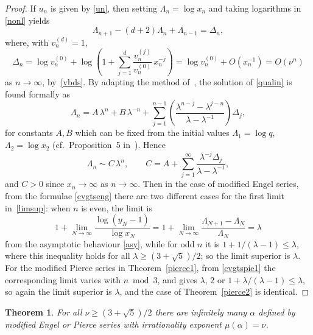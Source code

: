 \documentclass[10pt, a4paper]{amsart}
\numberwithin{equation}{section}
\newcommand\la{\lambda}
\newcommand\La{\Lambda}
\newcommand\De{\Delta}
\newcommand\al{{\alpha}}
\theoremstyle{plain}
\newtheorem{thm}{Theorem}[section]
\theoremstyle{definition}
\begin{document}
\begin{proof}
If $u_n$ is given by \eqref{un}, then setting 
$\La_n=\log x_n$ and taking logarithms in \eqref{nonl} yields
\begin{equation}
\label{qualin}
\La_{n+1}-(d+2)\La_n + \La_{n-1} = \De_n, 
\end{equation} 
where, with 
$v_n^{(d)}=1$, 
\[ 
\De_n  = \log v_n^{(0)} + 
\log \left(1+ \sum_{j=1}^{d} \frac{v_n^{(j)}}{v_n^{(0)}} \, x_n^{-j}\right) 
= \log v_n^{(0)} + O(x_n^{-1})=O(\nu^n)
\]
as $n\to \infty$, by~\eqref{vbds}.
By adapting the method of~\cite{ahosloane}, the solution of \eqref{qualin} 
is found formally as 
\begin{equation} 
\label{form}
\La_n = A\, \la^n + B\, \la^{-n} + \sum_{j=1}^{n-1} 
\left(\frac{\la^{n-j}-\la^{j-n}}{\la-\la^{-1}}\right) \De_j, 
\end{equation} 
for constants $A,B$ which can be fixed from the 
initial values $\La_1=\log q$, $\La_2=\log x_2$ 
(cf.\ Proposition~5 in~\cite{Hone1}).  Hence 
\begin{equation}
\label{asy} 
\La_n\sim C\,\la^n, \qquad C = A + \sum_{j=1}^\infty \frac{\la^{-j}\De_j}{\la-\la^{-1}}, 
\end{equation} 
and $C>0$ since $x_n\to\infty$ as $n\to\infty$. Then in the case 
of modified Engel series, from the formulae \eqref{cvgtseng} there are two different 
cases for the first limit in~\eqref{limsup}: when $n$ is even, the limit is 
\[ 
1+\lim_{N\to\infty}\frac{\log (y_N-1)}{\log x_N}=
1+ \lim_{N\to\infty}\frac{\La_{N+1}-\La_N}{\La_N}=\la 
\] 
from the asymptotic behaviour \eqref{asy}, while for odd $n$ it is 
$1+1/(\la-1)\leq \la$, 
where this inequality holds for all $\la\geq(3+\sqrt{5})/2$; 
so the limit superior is $\la$. For the modified Pierce 
series in Theorem~\ref{pierce1}, from \eqref{cvgtspie1} 
the corresponding limit varies with $n\bmod 3$, and 
gives $\la$, $2$ or $1+\la/(\la -1)\leq\la$, so again the limit superior is $\la$, 
and the case of Theorem~\ref{pierce2} is identical. 
\end{proof}

\begin{thm} 
For all $\nu\geq(3+\sqrt{5})/2$ there are 
infinitely many $\al$ defined by modified Engel or Pierce series 
with irrationality exponent $\mu(\al)=\nu$.   
\end{thm} 
\end{document}
